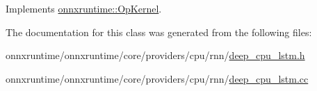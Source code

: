 Implements \mbox{\hyperlink{classonnxruntime_1_1OpKernel_a9eca8656a78b1b3ab9d3351a12798650}{onnxruntime\+::\+Op\+Kernel}}.



The documentation for this class was generated from the following files\+:\begin{DoxyCompactItemize}
\item 
onnxruntime/onnxruntime/core/providers/cpu/rnn/\mbox{\hyperlink{deep__cpu__lstm_8h}{deep\+\_\+cpu\+\_\+lstm.\+h}}\item 
onnxruntime/onnxruntime/core/providers/cpu/rnn/\mbox{\hyperlink{deep__cpu__lstm_8cc}{deep\+\_\+cpu\+\_\+lstm.\+cc}}\end{DoxyCompactItemize}
